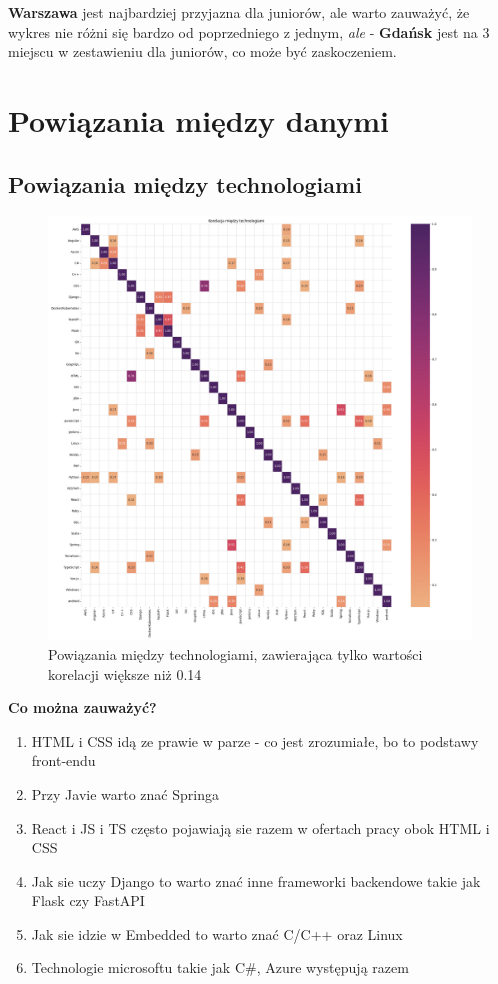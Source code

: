 \documentclass[a4paper]{article}
\begin{document}
\quad \textbf{Warszawa} jest najbardziej przyjazna dla juniorów, ale
warto zauważyć, że wykres nie różni się bardzo od poprzedniego z jednym, \textit{ale} - \textbf{Gdańsk} jest na 3 miejscu w zestawieniu dla juniorów, co może być zaskoczeniem.

\section{Powiązania między danymi}

\subsection{Powiązania między technologiami}

\begin{figure}[H]
    \centering
    \includegraphics[width=\textwidth]{../analysis/plots/korelacje/korelacja_między_technologiami.png}
    \caption{Powiązania między technologiami, zawierająca tylko wartości korelacji większe niż 0.14}
\end{figure}

\quad \textbf{Co można zauważyć?}

\begin{enumerate}
    \item HTML i CSS idą ze prawie w parze - co jest zrozumiałe, bo to podstawy front-endu
    \item Przy Javie warto znać Springa
    \item React i JS i TS często pojawiają sie razem w ofertach pracy obok HTML i CSS
    \item Jak sie uczy Django to warto znać inne frameworki backendowe takie jak Flask czy FastAPI
    \item Jak sie idzie w Embedded to warto znać C/C++ oraz Linux
    \item Technologie microsoftu takie jak C\#, Azure występują razem
\end{enumerate}
\end{document}
